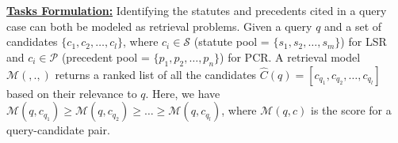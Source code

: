 \noindent\underline{\textbf{Tasks Formulation:}} Identifying the statutes and precedents cited in a query case can both be modeled as retrieval problems. Given a query $q$ and a set of candidates $\{c_1, c_2, \ldots, c_l\}$, where $c_i \in \mathcal S$ (statute pool = $\{s_1, s_2, \ldots, s_m\}$) for LSR and $c_i \in \mathcal P$ (precedent pool = $\{p_1, p_2, \ldots, p_n\}$) for PCR. A retrieval model $\mathcal{M}(,.,)$ returns a ranked list of all the candidates $\hat{C}(q) = [c_{q_1}, c_{q_2}, \ldots, c_{q_l}]$ based on their relevance to $q$. Here, we have $\mathcal M(q, c_{q_1}) \geq \mathcal M(q, c_{q_2}) \geq \ldots \geq \mathcal M(q, c_{q_l})$, where $\mathcal M(q, c)$ is the score for a query-candidate pair.  

